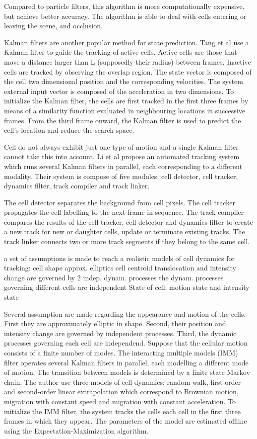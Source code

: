 \documentclass[12pt,a4paper,openany]{book}
\begin{document}
Compared to particle filters, this algorithm is more computationally expensive, but achieve better accuracy. The algorithm is able to deal with cells entering or leaving the scene, and occlusion.

Kalman filters are another popular method for state prediction. Tang et al \cite{tang??} use a Kalman filter to guide the tracking of active cells. Active cells are those that move a distance larger than L (supposedly their radius) between frames. Inactive cells are tracked by observing the overlap region. The state vector is composed of the cell two dimensional position and the corresponding velocities. The system external input vector is composed of the acceleration in two dimensions. To initialize the Kalman filter, the cells are first tracked in the first three frames by means of a similarity function evaluated in neighbouring locations in successive frames. From the third frame onward, the Kalman filter is used to predict the cell's location and reduce the search space.

Cell do not always exhibit just one type of motion and a single Kalman filter cannot take this into account. Li et al \cite{li07} propose an automated tracking system which runs several Kalman filters in parallel, each corresponding to a different modality. Their system is compose of five modules: cell detector, cell tracker, dynamics filter, track compiler and track linker.

The cell detector separates the background from cell pixels. The cell tracker propagates the cell labelling to the next frame in sequence. The track compiler compares the results of the cell tracker, cell detector and dynamics filter to create a new track for new or daughter cells, update or terminate existing tracks. The track linker connects two or more track segments if they belong to the same cell. 

a set of assumptions is made to reach a realistic models of cell dynamics for tracking:
cell shape approx. elliptics
cell centroid translocation and intensity change are governed by 2 indep. dynam. processes
the dynam. processes governing different cells are independent
State of cell: motion state and intensity state

Several assumption are made regarding the appearance and motion of the cells. First they are approximately elliptic in shape. Second, their position and intensity change are governed by independent processes. Third, the dynamic processes governing each cell are independend. Suppose that the cellular motion consists of a finite number of modes. The interacting multiple models (IMM) filter operates several Kalman filters in parallel, each modelling a different mode of motion. The transition between models is determined by a finite state Markov chain. The author use three models of cell dynamics: random walk, first-order and second-order linear extrapolation which correspond to Brownian motion, migration with constant speed and migration with constant acceleration. To initialize the IMM filter, the system tracks the cells each cell in the first three frames in which they appear. The parameters of the model are estimated offline using the Expectation-Maximization algorithm.
\end{document}

